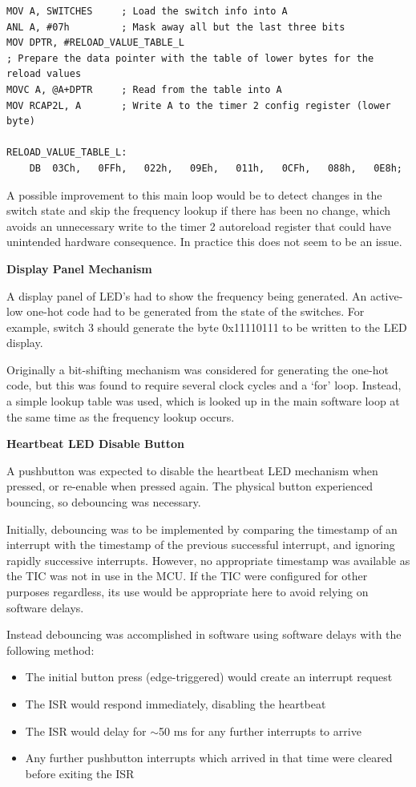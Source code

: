 \documentclass[11pt]{article}
\begin{document}
\begin{lstlisting}[label=lst:lookup-table-example,caption=Minimal example of a lookup table in Assembly]
MOV A, SWITCHES		; Load the switch info into A
ANL A, #07h			; Mask away all but the last three bits
MOV DPTR, #RELOAD_VALUE_TABLE_L
; Prepare the data pointer with the table of lower bytes for the reload values
MOVC A, @A+DPTR		; Read from the table into A
MOV RCAP2L, A		; Write A to the timer 2 config register (lower byte)

RELOAD_VALUE_TABLE_L:
    DB	03Ch,	0FFh,	022h,	09Eh,	011h,	0CFh,	088h,	0E8h;

\end{lstlisting}

A possible improvement to this main loop would be to detect changes in the switch state and skip the frequency lookup if there has been no change, which avoids an unnecessary write to the timer 2 autoreload register that could have unintended hardware consequence. In practice this does not seem to be an issue.

\textbf{Display Panel Mechanism}

A display panel of LED's had to show the frequency being generated. An active-low one-hot code had to be generated from the state of the switches. For example, switch 3 should generate the byte 0x11110111 to be written to the LED display.

Originally a bit-shifting mechanism was considered for generating the one-hot code, but this was found to require several clock cycles and a `for' loop. Instead, a simple lookup table was used, which is looked up in the main software loop at the same time as the frequency lookup occurs.

\textbf{Heartbeat LED Disable Button}

A pushbutton was expected to disable the heartbeat LED mechanism when pressed, or re-enable when pressed again. The physical button experienced bouncing, so debouncing was necessary.

Initially, debouncing was to be implemented by comparing the timestamp of an interrupt with the timestamp of the previous successful interrupt, and ignoring rapidly successive interrupts. However, no appropriate timestamp was available as the TIC was not in use in the MCU. If the TIC were configured for other purposes regardless, its use would be appropriate here to avoid relying on software delays.

Instead debouncing was accomplished in software using software delays with the following method:
\begin{itemize}
    \item The initial button press (edge-triggered) would create an interrupt request
    \item The ISR would respond immediately, disabling the heartbeat
    \item The ISR would delay for $\sim$50 ms for any further interrupts to arrive
    \item Any further pushbutton interrupts which arrived in that time were cleared before exiting the ISR
\end{itemize}
\end{document}
